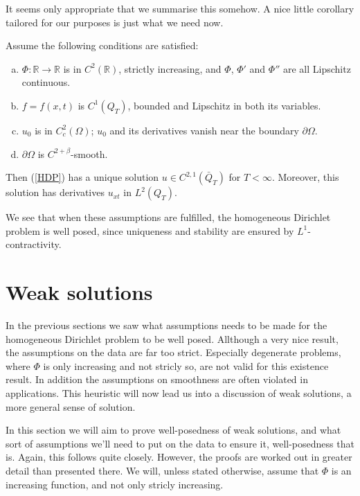 \documentclass[11pt, a4paper]{article}
\begin{document}
It seems only appropriate that we summarise this somehow. A nice little corollary tailored for our purposes is just what we need now.

\begin{cor}
\label{cor:GPME_existence}
Assume the following conditions are satisfied:
	\begin{enumerate}[a)]
		\item 	$\Phi: \mathbb{R} \to \mathbb{R}$ is in $C^2(\mathbb{R})$, strictly increasing, and $\Phi$, $\Phi'$ and $\Phi''$ are all Lipschitz continuous.
		
		\item $f = f(x,t)$ is $C^1(Q_T)$, bounded and Lipschitz in both its variables.
		
		\item $u_0$ is in $C^2_c(\Omega)$; $u_0$ and its derivatives vanish near the boundary $\partial \Omega$.
		
		\item $\partial \Omega$ is $C^{2+\beta}$-smooth.
	
	\end{enumerate}
Then (\ref{HDP}) has a unique solution $u\in C^{2,1}(\bar{Q}_T)$ for $T<\infty$. Moreover, this solution has derivatives $u_{xt}$ in $L^2(Q_T)$.
\end{cor}

We see that when these assumptions are fulfilled, the homogeneous Dirichlet problem is well posed, since uniqueness and stability are ensured by $L^1$-contractivity.


\newpage
\section{Weak solutions}
In the previous sections we saw what assumptions needs to be made for the homogeneous Dirichlet problem to be well posed. Allthough a very nice result, the assumptions on the data are far too strict. Especially degenerate problems, where $\Phi$ is only increasing and not stricly so, are not valid for this existence result. In addition the assumptions on smoothness are often violated in applications. This heuristic will now lead us into a discussion of weak solutions, a more general sense of solution. 

In this section we will aim to prove well-posedness of weak solutions, and what sort of assumptions we'll need to put on the data to ensure it, well-posedness that is. Again, this follows \citep[Ch. 5]{vazquez2007porous} quite closely. However, the proofs are worked out in greater detail than presented there. We will, unless stated otherwise, assume that $\Phi$ is an increasing function, and not only stricly increasing.
\end{document}
